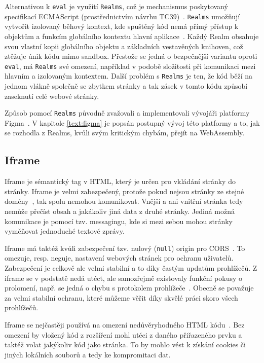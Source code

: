 Alternativou k \texttt{eval} je využití \texttt{Realms}, což je mechanismus poskytovaný specifikací ECMAScript (prostřednictvím návrhu TC39)~\cite{shadowrealms_propsal}. 
\texttt{Realms} umožňují vytvořit izolovaný běhový kontext, kde spuštěný kód nemá přímý přístup k objektům a funkcím globálního kontextu hlavní aplikace~\cite{shadowrealms_propsal, shadowrealms}.
Každý Realm obsahuje svou vlastní kopii globálního objektu a základních vestavěných knihoven, což ztěžuje únik kódu mimo sandbox.
Přestože se jedná o bezpečnější variantu oproti \texttt{eval}, má \texttt{Realms} své omezení, například v podobě složitosti při komunikaci mezi hlavním a izolovaným kontextem. 
Další problém s \texttt{Realms} je ten, že kód běží na jednom vlákně společně se zbytkem stránky a tak zásek v tomto kódu způsobí zaseknutí celé webové stránky.

Způsob pomocí \texttt{Realms} původně zvažovali a implementovali vývojáři platformy Figma~\cite{figma_plugins_blog}.
V kapitole \ref{text:figma} je popsán postupný vývoj této platformy a to, jak se rozhodla z Realms, kvůli svým kritickým chybám, přejít na WebAssembly.

\subsection{Iframe}

Iframe je sémantický tag v HTML, který je určen pro vkládání stránky do stránky.
Iframe je velmi zabezpečený, protože pokud nejsou stránky ze stejné domény~\cite{iframe, figma_plugins_blog}, tak spolu nemohou komunikovat.
Vnější a ani vnitřní stránka tedy nemůže přečíst obsah a jakákoliv jiná data z druhé stránky.
Jediná možná komunikace je pomocí tzv. messagingu, kde si mezi sebou mohou stránky vyměňovat jednoduché textové zprávy.

Iframe má taktéž kvůli zabezpečení tzv. nulový (\texttt{null}) origin pro CORS~\cite{iframe, figma_plugins_blog}.
To omezuje, resp. neguje, nastavení webových stránek pro ochranu uživatelů.
Zabezpečení je celkově ale velmi stabilní a to díky častým updatům prohlížečů.
Z iframe se v podstatě nedá utéct, ale samozřejmě existovaly funkční pokusy o prolomení, např. se jedná o chybu s protokolem prohlížeče~\cite{iframe_vuln}.
Obecně se považuje za velmi stabilní ochranu, které můžeme věřit díky skvělé práci skoro všech prohlížečů.

Iframe se nejčastěji používá na omezení nedůvěryhodného HTML kódu~\cite{iframe}.
Bez omezení by vložený kód z rozšíření mohl utéci z daného přiřazeného prvku a taktéž volat jakýkoliv kód jako stránka.
To by mohlo vést k získání cookies či jiných lokálních souborů a tedy ke kompromitaci dat.

